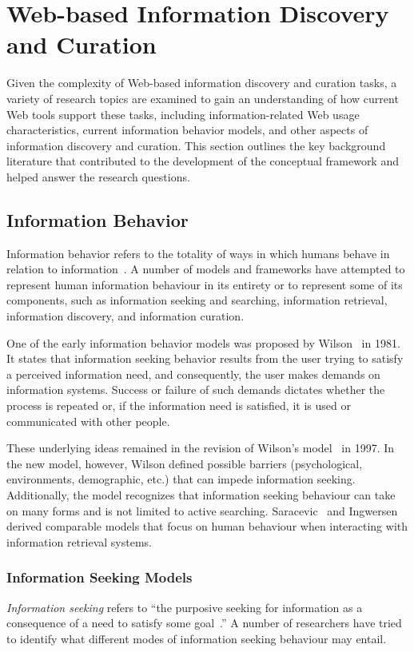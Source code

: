 \documentclass{sigchi}
\begin{document}
\section{Web-based Information Discovery and Curation}
\label{section:literature_review}
Given the complexity of Web-based information discovery and curation tasks, a variety of research topics are examined to gain an understanding of how current Web tools support these tasks, including information-related Web usage characteristics, current information behavior models, and other aspects of information discovery and curation.  This section outlines the key background literature that contributed to the development of the conceptual framework and helped answer the research questions. 

\subsection{Information Behavior}
Information behavior refers to the totality of ways in which humans behave in relation to information~\cite{wilson2000human}.  A number of models and frameworks have attempted to represent human information behaviour in its entirety or to represent some of its components, such as information seeking and searching, information retrieval, information discovery, and information curation. 

One of the early information behavior models was proposed by Wilson~\cite{wilson1981user} in 1981. It states that information seeking behavior results from the user trying to satisfy a perceived information need, and consequently, the user makes demands on information systems. Success or failure of such demands dictates whether the process is repeated or, if the information need is satisfied, it is used or communicated with other people. 

These underlying ideas remained in the revision of Wilson's model~\cite{wilson1997information} in 1997. In the new model, however, Wilson defined possible barriers (psychological, environments, demographic, etc.) that can impede information seeking. Additionally, the model recognizes that information seeking behaviour can take on many forms and is not limited to active searching. Saracevic~\cite{saracevic1996modeling} and Ingwersen~\cite{ingwersen1996cognitive} derived comparable models that focus on human behaviour when interacting with information retrieval systems. 

\subsubsection{Information Seeking Models}
\textit{Information seeking} refers to ``the purposive seeking for information as a consequence of a need to satisfy some goal~\cite{wilson2000human}.'' A number of researchers have tried to identify what different modes of information seeking behaviour may entail. 
\end{document}
